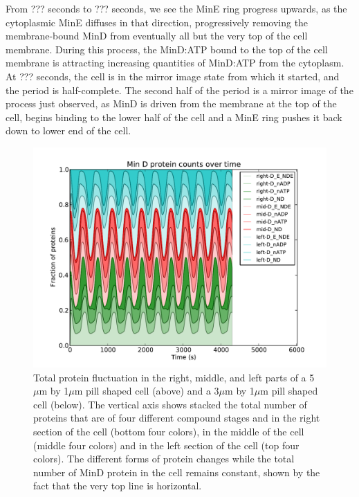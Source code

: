 \documentclass[letterpaper,twocolumn,amsmath,amssymb,pre]{revtex4-1}
\newcommand\micron{\ensuremath{\mu\text{m}}}
\begin{document}
From ??? seconds to ??? seconds, we see the MinE ring progress
upwards, as the cytoplasmic MinE diffuses in that direction,
progressively removing the membrane-bound MinD from eventually all but
the very top of the cell membrane.  During this process, the MinD:ATP
bound to the top of the cell membrane is attracting increasing
quantities of MinD:ATP from the cytoplasm.  At ??? seconds, the cell
is in the mirror image state from which it started, and the period is
half-complete.  The second half of the period is a mirror image of the
process just observed, as MinD is driven from the membrane at the top
of the cell, begins binding to the lower half of the cell and a MinE
ring pushes it back down to lower end of the cell.

\begin{figure}
  \includegraphics[width=\columnwidth]{../data/shape-p/plots/box-plot_D--p-300-50-0-0-1500}
  \caption{Total protein fluctuation in the right, middle, and left
    parts of a 5$\micron$ by 1$\micron$ pill shaped cell (above) and a
    3$\micron$ by 1$\micron$ pill shaped cell (below).  The vertical axis shows
    stacked the total number of proteins that are of four different
    compound stages and in the right section of the cell (bottom four
    colors), in the middle of the cell (middle four colors) and in the
    left section of the cell (top four colors). The different forms of
    protein changes while the total number of MinD protein in the cell
    remains constant, shown by the fact that the very top line is
    horizontal.}
  \label{box-p}
\end{figure}
\end{document}
